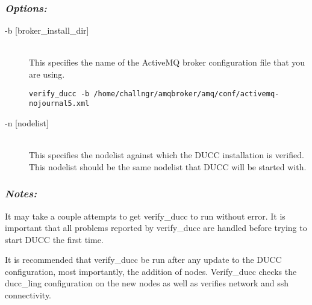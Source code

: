       \subsubsection{{\em Options:}}
          \begin{description}
            \item[-b {[broker\_install\_dir]}] \hfill \\
          This specifies the name of the ActiveMQ broker configuration file that you are using. 
\begin{verbatim}
verify_ducc -b /home/challngr/amqbroker/amq/conf/activemq-nojournal5.xml 
\end{verbatim}
          
          \item[-n {[nodelist]}] \hfill \\
            This specifies the nodelist against which the DUCC installation is verified. This nodelist             
            should be the same nodelist that DUCC will be started with. 
          \end{description}
        
      \subsubsection{{\em Notes:}}

      It may take a couple attempts to get verify\_ducc to run without error. It is important that all 
      problems reported by verify\_ducc are handled before trying to start DUCC the first time. 
      
      It is recommended that verify\_ducc be run after any update to the DUCC configuration, most 
      importantly, the addition of nodes. Verify\_ducc checks the ducc\_ling configuration on the new 
      nodes as well as verifies network and ssh connectivity. 


